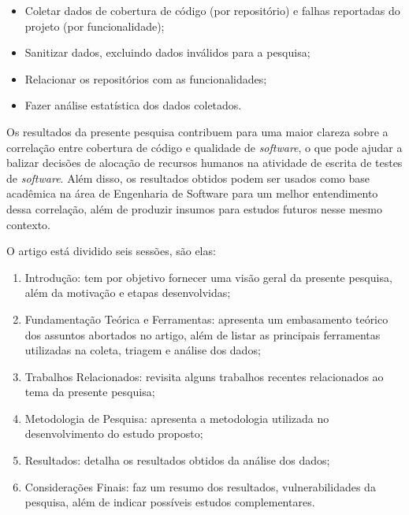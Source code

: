 \documentclass[11.5pt]{article}
\begin{document}
\begin{itemize}
    \item Coletar dados de cobertura de código (por repositório) e falhas reportadas do projeto (por
          funcionalidade);

    \item Sanitizar dados, excluindo dados inválidos para a pesquisa;

    \item Relacionar os repositórios com as funcionalidades;

    \item Fazer análise estatística dos dados coletados.
\end{itemize}

Os resultados da presente pesquisa contribuem para uma maior clareza sobre a correlação entre
cobertura de código e qualidade de \textit{software}, o que pode ajudar a balizar decisões de
alocação de recursos humanos na atividade de escrita de testes de \textit{software}.
Além disso, os resultados obtidos podem ser usados como base acadêmica na área de Engenharia de
Software para um melhor entendimento dessa correlação, além de produzir insumos para estudos futuros
nesse mesmo contexto.

O artigo está dividido seis sessões, são elas:
\begin{enumerate}
    \item Introdução: tem por objetivo fornecer uma visão geral da presente pesquisa, além da
          motivação e etapas desenvolvidas;

    \item Fundamentação Teórica e Ferramentas: apresenta um embasamento teórico dos assuntos
          abortados no artigo, além de listar as principais ferramentas utilizadas na coleta,
          triagem e análise dos dados;

    \item Trabalhos Relacionados: revisita alguns trabalhos recentes relacionados ao tema da
          presente pesquisa;

    \item Metodologia de Pesquisa: apresenta a metodologia utilizada no desenvolvimento do estudo
          proposto;

    \item Resultados: detalha os resultados obtidos da análise dos dados;

    \item Considerações Finais: faz um resumo dos resultados, vulnerabilidades da pesquisa, além de
          indicar possíveis estudos complementares.
\end{enumerate}
\end{document}
